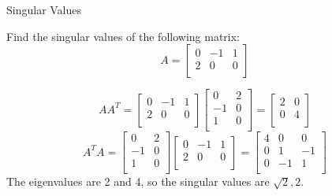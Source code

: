\documentclass{beamer}
\begin{document}
\begin{frame}{Singular Values}
\begin{example}
    Find the singular values of the following matrix:
    \begin{equation*}
        A=\left[ \begin{matrix}
            0&		-1&		1\\
            2&		0&		0\\
        \end{matrix} \right]
    \end{equation*}
\end{example}
\begin{equation*}
    AA^T=\left[ \begin{matrix}
        0&		-1&		1\\
        2&		0&		0\\
    \end{matrix} \right] \left[ \begin{matrix}
        0&		2\\
        -1&		0\\
        1&		0\\
    \end{matrix} \right] =\left[ \begin{matrix}
        2&		0\\
        0&		4\\
    \end{matrix} \right]
\end{equation*}
\begin{equation*}
    A^TA=\left[ \begin{matrix}
        0&		2\\
        -1&		0\\
        1&		0\\
    \end{matrix} \right] \left[ \begin{matrix}
        0&		-1&		1\\
        2&		0&		0\\
    \end{matrix} \right] =\left[ \begin{matrix}
        4&		0&		0\\
        0&		1&		-1\\
        0&		-1&		1\\
    \end{matrix} \right]
\end{equation*}
The eigenvalues are 2 and 4, so the singular values are $\sqrt{2}, 2$.
\end{frame}
\end{document}
